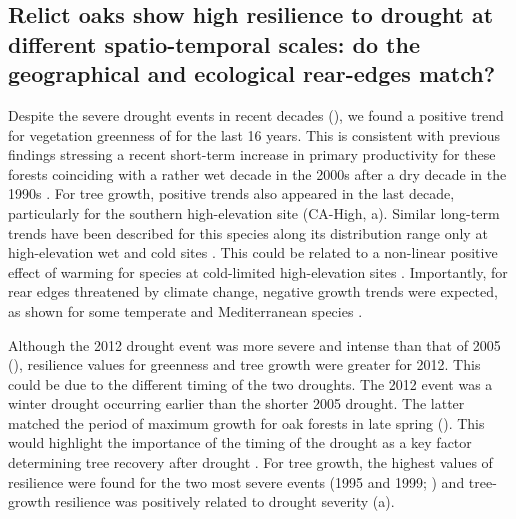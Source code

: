 \subsection{Relict oaks show high resilience to drought at different spatio-temporal scales: do the geographical and ecological rear-edges match?}\label{sec:dendro:Relict}
Despite the severe drought events in recent decades (), we found a positive trend for vegetation greenness of \Qp for the last 16 years. This is consistent with previous findings stressing a recent short-term increase in primary productivity for these forests coinciding with a rather wet decade in the 2000s after a dry decade in the 1990s \autocite{PerezLuqueetal2015OntologicalSystem}. For tree growth, positive trends also appeared in the last decade, particularly for the southern high-elevation site (CA-High, a). Similar long-term trends have been described for this species along its distribution range only at high-elevation wet and cold sites \autocite{GeaIzquierdoCanellas2014LocalClimate}. This could be related to a non-linear positive effect of warming for species at cold-limited high-elevation sites \autocite{Salzeretal2009RecentUnprecedented,GeaIzquierdoCanellas2014LocalClimate}. Importantly, for rear edges threatened by climate change, negative growth trends were expected, as shown for some temperate and Mediterranean species \autocite{SanchezSalgueroetal2012DroughtMain,Camareroetal2015NotEarly,DoradoLinanetal2017CoexistenceMediterraneanTemperate}.

Although the 2012 drought event was more severe and intense than that of 2005 (), resilience values for greenness and tree growth were greater for 2012. This could be due to the different timing of the two droughts. The 2012 event was a winter drought \autocite{Trigoetal2013RecordWinter} occurring earlier than the shorter 2005 drought. The latter matched the period of maximum growth for oak forests in late spring (). This would highlight the importance of the timing of the drought as a key factor determining tree recovery after drought \autocite{Camareroetal2015TimingDrought,Huangetal2018DroughtTiming}. For tree growth, the highest values of resilience were found for the two most severe events (1995 and 1999; ) and tree-growth resilience was positively related to drought severity (a).

